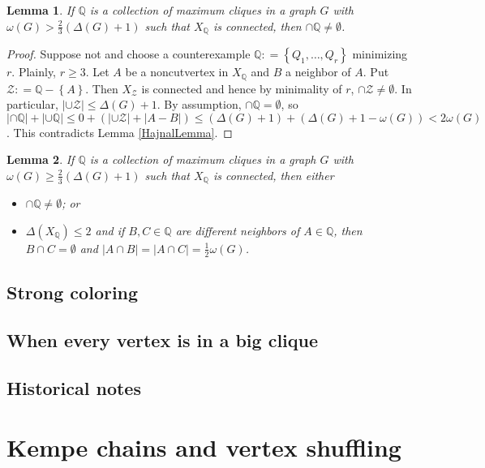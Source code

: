 \documentclass{tufte-book} %
\theoremstyle{plain}
\newtheorem{lemma}{Lemma}
\newcommand{\set}[1]{\left\{ #1 \right\}}
\newcommand{\card}[1]{\left|#1\right|}
\newcommand{\DefinedAs}{\mathrel{\mathop:}=}
\newcommand{\Q}{\mathbb{Q}}
\newcommand{\fancy}[1]{\mathcal{#1}}
\begin{document}
\begin{lemma}\label{KostochkaCliqueGraph}
If $\Q$ is a collection of maximum cliques in a graph $G$ with $\omega(G) > \frac23 (\Delta(G) + 1)$ such that $X_\Q$ is connected, then $\cap \Q \neq \emptyset$. 
\end{lemma}
\begin{proof}
Suppose not and choose a counterexample $\Q \DefinedAs \set{Q_1, \ldots, Q_r}$
minimizing $r$. Plainly, $r \geq 3$. Let $A$ be a noncutvertex in $X_{\Q}$ and
$B$ a neighbor of $A$. Put $\fancy{Z} \DefinedAs \Q - \set{A}$. Then
$X_{\fancy{Z}}$ is connected and hence by minimality of $r$, $\cap \fancy{Z}
\neq \emptyset$. In particular, $\card{\cup \fancy{Z}} \leq \Delta(G) + 1$.
By assumption, $\cap\Q=\emptyset$, so $\card{\cap \Q} + \card{\cup \Q} \leq 0 +
(\card{\cup \fancy{Z}} + \card{A - B}) \leq
(\Delta(G) + 1) + (\Delta(G)+1 - \omega(G)) < 2\omega(G)$. This contradicts
Lemma \ref{HajnalLemma}.
\end{proof}

\begin{lemma}\label{TwoThirdsEqualityStructure}
If $\Q$ is a collection of maximum cliques in a graph $G$ with $\omega(G) \ge \frac23 (\Delta(G) + 1)$ such that $X_\Q$ is connected, then either 
\begin{itemize}
\item $\cap \Q \ne \emptyset$; or
\item $\Delta(X_\Q) \le 2$ and if $B, C \in \Q$ are different neighbors of $A \in \Q$, then $B \cap C = \emptyset$ and $\card{A \cap B} = \card{A \cap C} = \frac12 \omega(G)$.
\end{itemize}
\end{lemma}

\section{Strong coloring}
\section{When every vertex is in a big clique}
\section{Historical notes}

\chapter{Kempe chains and vertex shuffling}
\end{document}
